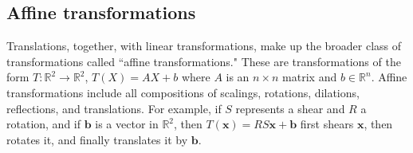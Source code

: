 \subsection*{Affine transformations}
Translations, together, with linear transformations, make up the broader class of transformations called ``affine transformations." 
These are transformations of the form $T: \mathbb{R}^2 \to \mathbb{R}^2$, $T(X) = AX + b$ where $A$ is an $n\times n$ matrix and $b \in \mathbb{R}^n$. 
Affine transformations include all compositions of scalings, rotations, dilations, reflections, and translations. 
For example, if $S$ represents a shear and $R$ a rotation, and if $\mathbf{b}$ is a vector in $\mathbb{R}^2$, then $T(\mathbf{x}) = RS\mathbf{x} + \mathbf{b}$ first shears $\mathbf{x}$, then rotates it, and finally translates it by $\mathbf{b}$. 


